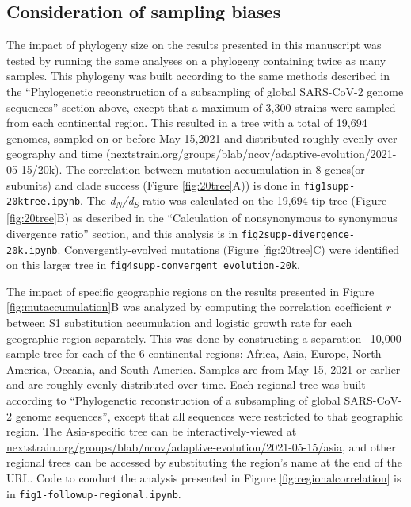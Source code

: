 \documentclass[11pt,oneside,letterpaper]{article}
\newcommand{\dnds}{\emph{d\textsubscript{N}/d\textsubscript{S}}}
\begin{document}
\subsection*{Consideration of sampling biases}
The impact of phylogeny size on the results presented in this manuscript was tested by running the same analyses on a phylogeny containing twice as many samples.
This phylogeny was built according to the same methods described in the ``Phylogenetic reconstruction of a subsampling of global SARS-CoV-2 genome sequences'' section above, except that a maximum of 3,300 strains were sampled from each continental region.
This resulted in a tree with a total of 19,694 genomes, sampled on or before May 15,2021 and distributed roughly evenly over geography and time (\href{https://nextstrain.org/groups/blab/ncov/adaptive-evolution/2021-05-15/20k}{nextstrain.org/groups/blab/ncov/adaptive-evolution/2021-05-15/20k}).
The correlation between mutation accumulation in 8 genes(or subunits) and clade success (Figure \ref{fig:20tree}A)) is done in \texttt{fig1supp-20ktree.ipynb}.
The \dnds{} ratio was calculated on the 19,694-tip tree (Figure \ref{fig:20tree}B) as described in the ``Calculation of nonsynonymous to synonymous divergence ratio'' section, and this analysis is in \texttt{fig2supp-divergence-20k.ipynb}.
Convergently-evolved mutations (Figure \ref{fig:20tree}C) were identified on this larger tree in \texttt{fig4supp-convergent\_evolution-20k}.

The impact of specific geographic regions on the results presented in Figure \ref{fig:mutaccumulation}B was analyzed by computing the correlation coefficient $r$ between S1 substitution accumulation and logistic growth rate for each geographic region separately.
This was done by constructing a separation ~10,000-sample tree for each of the 6 continental regions: Africa, Asia, Europe, North America, Oceania, and South America.
Samples are from May 15, 2021 or earlier and are roughly evenly distributed over time.
Each regional tree was built according to ``Phylogenetic reconstruction of a subsampling of global SARS-CoV-2 genome sequences'', except that all sequences were restricted to that geographic region.
The Asia-specific tree can be interactively-viewed at \href{https://nextstrain.org/groups/blab/ncov/adaptive-evolution/2021-05-15/asia}{nextstrain.org/groups/blab/ncov/adaptive-evolution/2021-05-15/asia}, and other regional trees can be accessed by substituting the region's name at the end of the URL.
Code to conduct the analysis presented in Figure \ref{fig:regionalcorrelation} is in \texttt{fig1-followup-regional.ipynb}.
\end{document}
